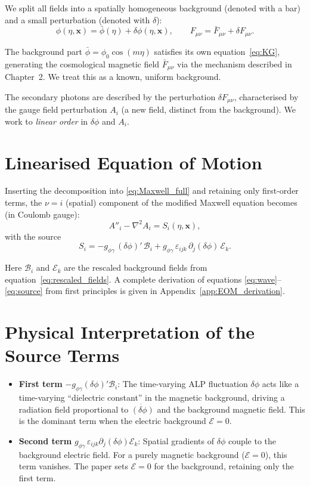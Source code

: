 \documentclass[12pt,a4paper]{report}
\newcommand{\gag}{g_{\phi\gamma}}
\renewcommand{\vec}[1]{\boldsymbol{#1}}
\newcommand{\phizero}{\phi_0}
\theoremstyle{definition}
\begin{document}
We split all fields into a spatially homogeneous background (denoted with a bar) and
a small perturbation (denoted with $\delta$):
\begin{equation}
  \phi(\eta,\vec{x}) = \bar\phi(\eta) + \delta\phi(\eta,\vec{x}),
  \qquad
  F_{\mu\nu} = \bar{F}_{\mu\nu} + \delta F_{\mu\nu}.
\end{equation}

The background part $\bar\phi = \phizero\cos(m\eta)$ satisfies its own
equation~\eqref{eq:KG}, generating the cosmological magnetic field $\bar{F}_{\mu\nu}$
via the mechanism described in Chapter~2. We treat this as a known, uniform background.

The secondary photons are described by the perturbation $\delta F_{\mu\nu}$,
characterised by the gauge field perturbation $A_i$ (a new field, distinct from the
background). We work to \emph{linear order} in $\delta\phi$ and $A_i$.

\section{Linearised Equation of Motion}

Inserting the decomposition into \eqref{eq:Maxwell_full} and retaining only
first-order terms, the $\nu=i$ (spatial) component of the modified Maxwell equation
becomes (in Coulomb gauge):
\begin{equation}
  \boxed{A''_i - \nabla^2 A_i = S_i(\eta,\vec{x})},
  \label{eq:wave}
\end{equation}
with the source
\begin{equation}
  \boxed{S_i = -\gag\,(\delta\phi)'\,\mathcal{B}_i
              + \gag\,\varepsilon_{ijk}\,\partial_j(\delta\phi)\,\mathcal{E}_k}.
  \label{eq:source}
\end{equation}

Here $\mathcal{B}_i$ and $\mathcal{E}_k$ are the rescaled background fields from
equation~\eqref{eq:rescaled_fields}. A complete derivation of equations
\eqref{eq:wave}--\eqref{eq:source} from first principles is given in
Appendix~\ref{app:EOM_derivation}.

\section{Physical Interpretation of the Source Terms}

\begin{itemize}
  \item \textbf{First term} $-\gag(\delta\phi)'\mathcal{B}_i$: The time-varying ALP
    fluctuation $\delta\phi$ acts like a time-varying ``dielectric constant'' in the
    magnetic background, driving a radiation field proportional to $\dot{(\delta\phi)}$
    and the background magnetic field. This is the dominant term when the electric
    background $\mathcal{E}=0$.
  \item \textbf{Second term} $\gag\,\varepsilon_{ijk}\partial_j(\delta\phi)\mathcal{E}_k$:
    Spatial gradients of $\delta\phi$ couple to the background electric field. For a
    purely magnetic background ($\mathcal{E}=0$), this term vanishes. The paper sets
    $\mathcal{E}=0$ for the background, retaining only the first term.
\end{itemize}
\end{document}
